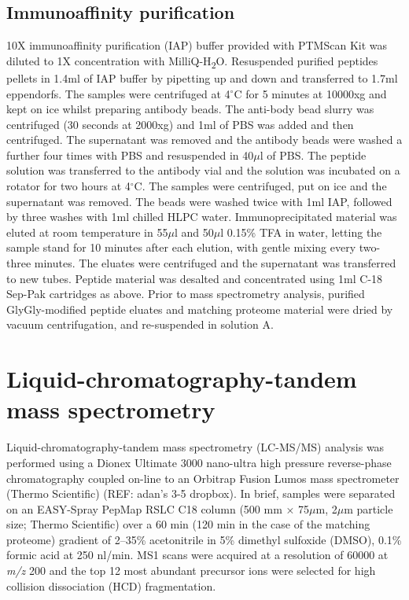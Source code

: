 \subsection{Immunoaffinity purification}
10X immunoaffinity purification (IAP) buffer provided with PTMScan Kit was diluted to 1X concentration with MilliQ-H\textsubscript{2}O. Resuspended purified peptides pellets in 1.4ml of IAP buffer by pipetting up and down and transferred to 1.7ml eppendorfs. The samples were centrifuged at 4$^{\circ}$C for 5 minutes at 10000xg and kept on ice whilst preparing antibody beads.
The anti-body bead slurry was centrifuged (30 seconds at 2000xg) and 1ml of PBS was added and then centrifuged. The supernatant was removed and the antibody beads were washed a further four times with PBS and resuspended in 40$\mu$l of PBS. The peptide solution was transferred to the antibody vial and the solution was incubated on a rotator for two hours at 4$^{\circ}$C. The samples were centrifuged, put on ice and the supernatant was removed. The beads were washed twice with 1ml IAP, followed by three washes with 1ml chilled HLPC water. Immunoprecipitated material was eluted at room temperature in 55$\mu$l and 50$\mu$l 0.15\% TFA in water, letting the sample stand for 10 minutes after each elution, with gentle mixing every two-three minutes. The eluates were centrifuged and the supernatant was transferred to new tubes. Peptide material was desalted and concentrated using 1ml C-18 Sep-Pak cartridges as above. Prior to mass spectrometry analysis, purified GlyGly-modified peptide eluates and matching proteome material were dried by vacuum centrifugation, and re-suspended in solution A.
%

\section{Liquid-chromatography-tandem mass spectrometry}
Liquid-chromatography-tandem mass spectrometry (LC-MS/MS) analysis was performed using a Dionex Ultimate 3000 nano-ultra high pressure reverse-phase chromatography coupled on-line to an Orbitrap Fusion Lumos mass spectrometer (Thermo Scientific) (REF: adan's 3-5 dropbox). In brief, samples were separated on an EASY-Spray PepMap RSLC C18 column (500 mm × 75$\mu$m, 2$\mu$m particle size; Thermo Scientific) over a 60 min (120 min in the case of the matching proteome) gradient of 2–35\% acetonitrile in 5\% dimethyl sulfoxide (DMSO), 0.1\% formic acid at 250 nl/min. MS1 scans were acquired at a resolution of 60000 at \textit{m/z} 200 and the top 12 most abundant precursor ions were selected for high collision dissociation (HCD) fragmentation.

